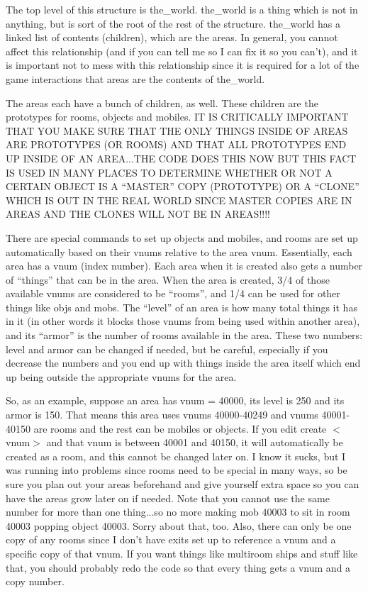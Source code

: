 The top level of this structure is the\_world. the\_world is a thing
which is not in anything, but is sort of the root of the rest of the
structure. the\_world has a linked list of contents (children), which
are the areas. In general, you cannot affect this relationship (and if
you can tell me so I can fix it so you can't), and it is important not
to mess with this relationship since it is required for a lot of the
game interactions that areas are the contents of the\_world.

The areas each have a bunch of children, as well. These children are
the prototypes for rooms, objects and mobiles. IT IS CRITICALLY
IMPORTANT THAT YOU MAKE SURE THAT THE ONLY THINGS INSIDE OF AREAS ARE
PROTOTYPES (OR ROOMS) AND THAT ALL PROTOTYPES END UP INSIDE OF AN
AREA...THE CODE DOES THIS NOW BUT THIS FACT IS USED IN MANY PLACES TO
DETERMINE WHETHER OR NOT A CERTAIN OBJECT IS A ``MASTER'' COPY
(PROTOTYPE) OR A ``CLONE'' WHICH IS OUT IN THE REAL WORLD SINCE MASTER
COPIES ARE IN AREAS AND THE CLONES WILL NOT BE IN AREAS!!!!

There are special commands to set up objects and mobiles, and rooms
are set up automatically based on their vnums relative to the area
vnum. Essentially, each area has a vnum (index number). Each area when
it is created also gets a number of ``things'' that can be in the
area. When the area is created, 3/4 of those available vnums are
considered to be ``rooms'', and 1/4 can be used for other things like
objs and mobs. The ``level'' of an area is how many total things it
has in it (in other words it blocks those vnums from being used within
another area), and its ``armor'' is the number of rooms available in
the area. These two numbers: level and armor can be changed if needed,
but be careful, especially if you decrease the numbers and you end up
with things inside the area itself which end up being outside the
appropriate vnums for the area.

 So, as an example, suppose an area has vnum = 40000, its level is 250
 and its armor is 150. That means this area uses vnums 40000-40249 and
 vnums 40001-40150 are rooms and the rest can be mobiles or
 objects. If you edit create $<$vnum$>$ and that vnum is between 40001
 and 40150, it will automatically be created as a room, and this
 cannot be changed later on. I know it sucks, but I was running into
 problems since rooms need to be special in many ways, so be sure you
 plan out your areas beforehand and give yourself extra space so you
 can have the areas grow later on if needed. Note that you cannot use
 the same number for more than one thing...so no more making mob 40003
 to sit in room 40003 popping object 40003. Sorry about that,
 too. Also, there can only be one copy of any rooms since I don't have
 exits set up to reference a vnum and a specific copy of that vnum. If
 you want things like multiroom ships and stuff like that, you should
 probably redo the code so that every thing gets a vnum and a copy
 number.


